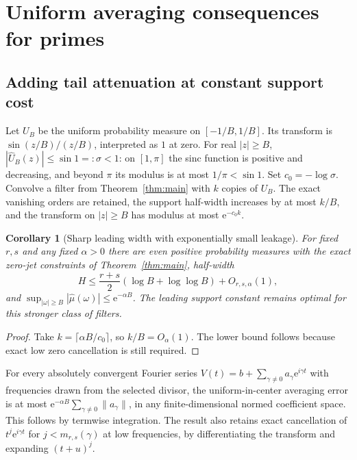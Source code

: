 \documentclass[11pt]{article}
\newtheorem{corollary}[theorem]{Corollary}
\theoremstyle{remark}\newtheorem{remark}[theorem]{Remark}
\newcommand{\e}{\mathrm e}
\begin{document}
\section{Uniform averaging consequences for primes}
\subsection{Adding tail attenuation at constant support cost}
Let $U_B$ be the uniform probability measure on $[-1/B,1/B]$. Its transform is $\sin(z/B)/(z/B)$, interpreted as $1$ at zero. For real $|z|\ge B$,
$|\widehat U_B(z)|\le\sin1=:\sigma<1$: on $[1,\pi]$ the sinc function is positive and decreasing, and beyond $\pi$ its modulus is at most $1/\pi<\sin1$. Set $c_0=-\log\sigma$. Convolve a filter from Theorem~\ref{thm:main} with $k$ copies of $U_B$. The exact vanishing orders are retained, the support half-width increases by at most $k/B$, and the transform on $|z|\ge B$ has modulus at most $\e^{-c_0 k}$.

\begin{corollary}[Sharp leading width with exponentially small leakage]\label{cor:leak}
For fixed $r,s$ and any fixed $\alpha>0$ there are even positive probability measures with the exact zero-jet constraints of Theorem~\ref{thm:main}, half-width
\[
 H\le\frac{r+s}{2}(\log B+\log\log B)+O_{r,s,\alpha}(1),
\]
and $\sup_{|\omega|\ge B}|\widehat\mu(\omega)|\le\e^{-\alpha B}$. The leading support constant remains optimal for this stronger class of filters.
\end{corollary}
\begin{proof}
Take $k=\lceil\alpha B/c_0\rceil$, so $k/B=O_\alpha(1)$. The lower bound follows because exact low zero cancellation is still required.
\end{proof}
For every absolutely convergent Fourier series $V(t)=b+\sum_{\gamma\ne0}a_\gamma\e^{i\gamma t}$ with frequencies drawn from the selected divisor, the uniform-in-center averaging error is at most $\e^{-\alpha B}\sum_{\gamma\ne0}\|a_\gamma\|$, in any finite-dimensional normed coefficient space. This follows by termwise integration. The result also retains exact cancellation of $t^j\e^{i\gamma t}$ for $j<m_{r,s}(\gamma)$ at low frequencies, by differentiating the transform and expanding $(t+u)^j$.
\end{document}
